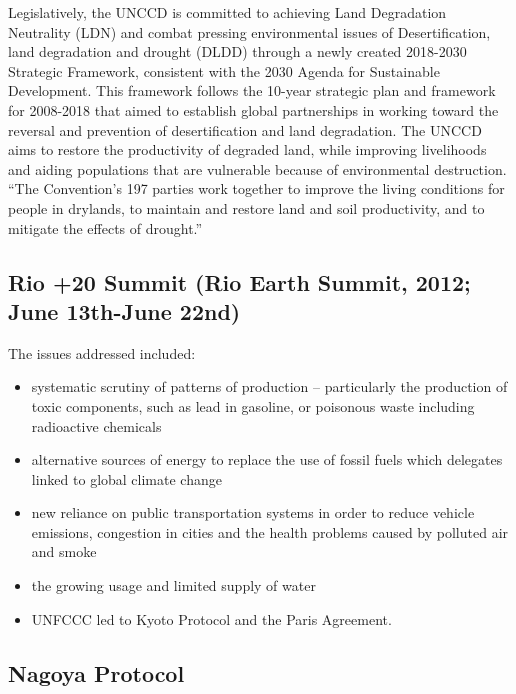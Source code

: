 \documentclass[
  openany]{book}
\providecommand{\tightlist}{%
  \setlength{\itemsep}{0pt}\setlength{\parskip}{0pt}}
\begin{document}
Legislatively, the UNCCD is committed to achieving Land Degradation Neutrality (LDN) and combat pressing environmental issues of Desertification, land degradation and drought (DLDD) through a newly created 2018-2030 Strategic Framework, consistent with the 2030 Agenda for Sustainable Development. This framework follows the 10-year strategic plan and framework for 2008-2018 that aimed to establish global partnerships in working toward the reversal and prevention of desertification and land degradation. The UNCCD aims to restore the productivity of degraded land, while improving livelihoods and aiding populations that are vulnerable because of environmental destruction. ``The Convention's 197 parties work together to improve the living conditions for people in drylands, to maintain and restore land and soil productivity, and to mitigate the effects of drought.''

\hypertarget{rio-20-summit-rio-earth-summit-2012-june-13th-june-22nd}{%
\subsection{Rio +20 Summit (Rio Earth Summit, 2012; June 13th-June 22nd)}\label{rio-20-summit-rio-earth-summit-2012-june-13th-june-22nd}}

The issues addressed included:

\begin{itemize}
\tightlist
\item
  systematic scrutiny of patterns of production -- particularly the production of toxic components, such as lead in gasoline, or poisonous waste including radioactive chemicals
\item
  alternative sources of energy to replace the use of fossil fuels which delegates linked to global climate change
\item
  new reliance on public transportation systems in order to reduce vehicle emissions, congestion in cities and the health problems caused by polluted air and smoke
\item
  the growing usage and limited supply of water
\item
  UNFCCC led to Kyoto Protocol and the Paris Agreement.
\end{itemize}

\hypertarget{nagoya-protocol}{%
\subsection{Nagoya Protocol}\label{nagoya-protocol}}
\end{document}
